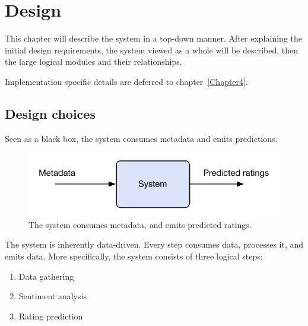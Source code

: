 
\chapter{Design} %

\label{Chapter3} %



% 


This chapter will describe the system in a top-down manner. After explaining the initial design requirements, the system viewed as a whole will be described, then the large logical modules and their relationships.

Implementation specific details are deferred to chapter~\ref{Chapter4}.

\section{Design choices} %
\label{sec:design_choices}

Seen as a black box, the system consumes metadata and emits predictions.

\begin{figure}[h]
  \centering
    \includegraphics{Figures/dataflow}
  \caption{The system consumes metadata, and emits predicted ratings.}
  \label{fig:dataflow}
\end{figure}

The system is inherently data-driven. Every step consumes data, processes it, and emits data. More specifically, the system consists of three logical steps:

\begin{enumerate}
  \item Data gathering
  \item Sentiment analysis
  \item Rating prediction
\end{enumerate}

